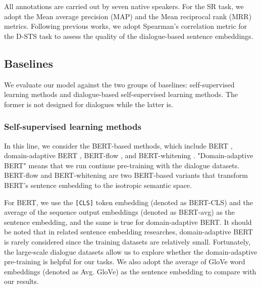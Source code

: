 \documentclass[11pt]{article}
\begin{document}
All annotations are carried out by seven native speakers.
For the SR task, we adopt the Mean average precision (MAP) and the Mean reciprocal rank (MRR) metrics.
Following previous works, we adopt Spearman's correlation metric for the D-STS task to assess the quality of the dialogue-based sentence embeddings.

\subsection{Baselines}
We evaluate our model against the two groups of baselines: self-supervised learning methods and dialogue-based self-supervised learning methods.
The former is not designed for dialogues while the latter is.

\subsubsection{\textbf{Self-supervised learning methods}}
In this line, we consider the BERT-based methods, which include BERT \cite{bert}, domain-adaptive BERT \cite{bert_dapt}, BERT-flow \cite{bert_flow}, and BERT-whitening \cite{bert_whitening}.
"Domain-adaptive BERT" means that we run continue pre-training with the dialogue datasets.
BERT-flow and BERT-whitening are two BERT-based variants that transform BERT's sentence embedding to the isotropic semantic space.

For BERT, we use the \texttt{[CLS]} token embedding (denoted as BERT-CLS) and the average of the sequence output embeddings (denoted as BERT-avg) as the sentence embedding, and the same is true for domain-adaptive BERT.
It should be noted that in related sentence embedding researches, domain-adaptive BERT is rarely considered since the training datasets are relatively small.
Fortunately, the large-scale dialogue datasets allow us to explore whether the domain-adaptive pre-training is helpful for our tasks.
We also adopt the average of GloVe word embeddings \cite{pennington2014glove} (denoted as Avg. GloVe) as the sentence embedding to compare with our results.
\end{document}
